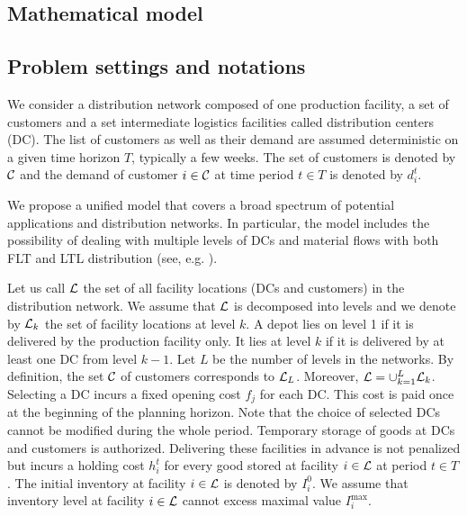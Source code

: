 \documentclass[a4paper,10pt]{article}
\begin{document}
\begin{linenumbers}
\section{Mathematical model}

\label{sec:model}

\subsection{Problem settings and notations}\label{subsection:settings}


We consider a  distribution network composed of one production facility, 
a set of customers and a set intermediate logistics facilities called distribution centers (DC). 
The list of customers as well as their demand are assumed deterministic on a given time horizon $T$, typically a few weeks. 
The set of customers is denoted by $\mathcal{C}$ and the demand of customer $i \in \mathcal{C}$ at time period $t\in T$ is denoted by $d^t_i$.

We propose a unified model that covers a broad spectrum of potential applications and distribution networks. 
In particular, the model includes the possibility of dealing with multiple levels of DCs and material flows with both FLT and LTL distribution (see, e.g. \cite{AmbScu05}). 

Let us call $\mathcal{L}$ the set of all facility locations (DCs and customers) in the distribution network. 
We assume that $\mathcal{L}$ is decomposed into levels and we denote by $\mathcal{L}_k$ the set of facility locations at level $k$. 
A depot lies on level 1 if it is delivered by the production facility only. 
It lies at level $k$ if it is delivered by at least one DC from level $k-1$. 
Let $L$ be the number of levels in the networks. By definition, the set $\mathcal{C}$ of customers corresponds to $\mathcal{L}_L$.
Moreover, $\mathcal{L}=\cup_{k=1}^L \mathcal{L}_k$.
%
Selecting a DC incurs a fixed opening cost $f_j$ for each DC. 
This cost is paid once at the beginning of the planning horizon. 
Note that the choice of selected DCs cannot be modified during the whole period. 
%
Temporary storage of goods at DCs and customers is authorized. 
Delivering these facilities in advance is not penalized but incurs a holding cost $h^t_i$ for every good stored at facility $i \in \mathcal{L}$ at period $t \in T$.
The initial inventory at facility $i \in \mathcal{L}$ is denoted by $I_i^0$. 
We assume that inventory level at facility $i \in \mathcal{L}$ cannot excess maximal value $I_i^{\max}$. 


\end{linenumbers}
\end{document}
